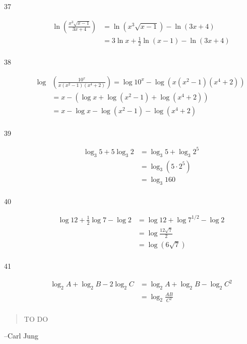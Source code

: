 \documentclass{exam}
\begin{document}
\begin{description}
      \item[37] 
        \begin{align*}
          \ln \left( \frac{x^3 \sqrt{x - 1}}{3x + 4} \right) &= \ln (x^3 \sqrt{x - 1}) - \ln (3x + 4) \\
                                                             &= 3 \ln x + \frac{1}{2} \ln (x - 1) - \ln (3x + 4) \\
        \end{align*}

      \item[38] 
        \begin{align*}
          \log & \left( \frac{10^x}{x(x^2 - 1)(x^4 + 2)} \right) = \log 10^x - \log (x(x^2 - 1)(x^4 + 2)) \\
                                                               &= x - ( \log x + \log (x^2 - 1) + \log (x^4 + 2)) \\
                                                               &= x - \log x - \log (x^2 - 1) - \log (x^4 + 2) \\
        \end{align*}

      \item[39] 
        \begin{align*}
          \log_3 5 + 5 \log_3 2 &= \log_3 5 + \log_3 2^5 \\
                                &= \log_3 (5 \cdot 2^5) \\
                                &= \log_3 160 \\
        \end{align*}

      \item[40] 
        \begin{align*}
          \log 12 + \frac{1}{2} \log 7 - \log 2 &= \log 12 + \log 7^{1/2} - \log 2 \\
                                                &= \log \frac{12 \sqrt{7}}{2} \\
                                                &= \log (6 \sqrt{7}) \\
        \end{align*}

      \item[41] 
        \begin{align*}
          \log_2 A + \log_2 B - 2 \log_2 C &= \log_2 A + \log_2 B - \log_2 C^2 \\
                                           &= \log_2 \frac{AB}{C^2} \\
        \end{align*}

    \end{description}

  \else
    \vspace{2 cm}
    \begin{quote}
      \begin{em}
        TO DO
      \end{em}
    \end{quote}

    \hspace{1 cm} --Carl Jung
  \fi
\end{document}

